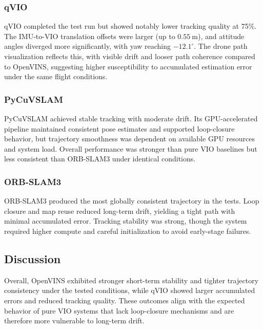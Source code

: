 \subsubsection{qVIO}
qVIO completed the test run but showed notably lower tracking quality at 75\%. The IMU-to-VIO translation offsets were larger (up to \(0.55~\text{m}\)), and attitude angles diverged more significantly, with yaw reaching \(-12.1^{\circ}\). The drone path visualization reflects this, with visible drift and looser path coherence compared to OpenVINS, suggesting higher susceptibility to accumulated estimation error under the same flight conditions.

\subsubsection{PyCuVSLAM}
PyCuVSLAM achieved stable tracking with moderate drift. Its GPU-accelerated pipeline maintained consistent pose estimates and supported loop-closure behavior, but trajectory smoothness was dependent on available GPU resources and system load. Overall performance was stronger than pure VIO baselines but less consistent than ORB-SLAM3 under identical conditions.

\subsubsection{ORB-SLAM3}
ORB-SLAM3 produced the most globally consistent trajectory in the tests. Loop closure and map reuse reduced long-term drift, yielding a tight path with minimal accumulated error. Tracking stability was strong, though the system required higher compute and careful initialization to avoid early-stage failures.

\subsection{Discussion}
Overall, OpenVINS exhibited stronger short-term stability and tighter trajectory consistency under the tested conditions, while qVIO showed larger accumulated errors and reduced tracking quality. These outcomes align with the expected behavior of pure VIO systems that lack loop-closure mechanisms and are therefore more vulnerable to long-term drift.

